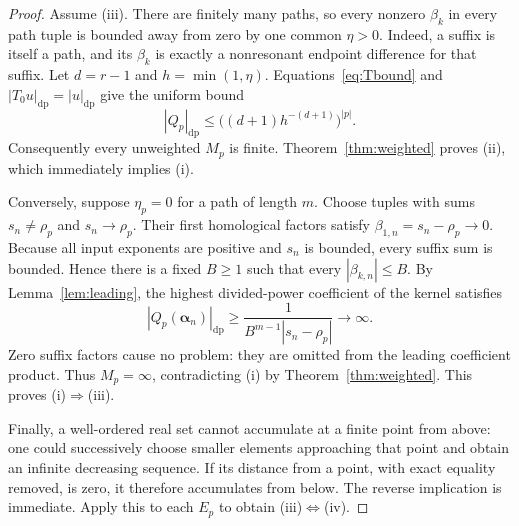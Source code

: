 \documentclass[11pt,a4paper]{article}
\numberwithin{equation}{section}
\theoremstyle{definition}
\theoremstyle{remark}
\begin{document}
\begin{proof}
Assume (iii). There are finitely many paths, so every nonzero $\beta_k$
in every path tuple is bounded away from zero by one common $\eta>0$.
Indeed, a suffix is itself a path, and its $\beta_k$ is exactly a
nonresonant endpoint difference for that suffix. Let $d=r-1$ and
$h=\min(1,\eta)$. Equations~\eqref{eq:Tbound} and
$|T_0u|_{\mathrm{dp}}=|u|_{\mathrm{dp}}$ give the uniform bound
\[
 |Q_p|_{\mathrm{dp}}
 \leq\bigl((d+1)h^{-(d+1)}\bigr)^{|p|}.
\]
Consequently every unweighted $M_p$ is finite. Theorem~\ref{thm:weighted}
proves (ii), which immediately implies (i).

Conversely, suppose $\eta_p=0$ for a path of length $m$. Choose tuples
with sums $s_n\ne\rho_p$ and $s_n\to\rho_p$. Their first homological
factors satisfy $\beta_{1,n}=s_n-\rho_p\to0$. Because all input exponents
are positive and $s_n$ is bounded, every suffix sum is bounded. Hence there
is a fixed $B\geq1$ such that every $|\beta_{k,n}|\leq B$. By
Lemma~\ref{lem:leading}, the highest divided-power coefficient of the
kernel satisfies
\begin{equation}\label{eq:blowup}
 |Q_p(\boldsymbol\alpha_n)|_{\mathrm{dp}}
 \geq\frac{1}{B^{m-1}|s_n-\rho_p|}\longrightarrow\infty.
\end{equation}
Zero suffix factors cause no problem: they are omitted from the leading
coefficient product. Thus $M_p=\infty$, contradicting (i) by
Theorem~\ref{thm:weighted}. This proves (i)$\Rightarrow$(iii).

Finally, a well-ordered real set cannot accumulate at a finite point from
above: one could successively choose smaller elements approaching that
point and obtain an infinite decreasing sequence. If its distance from a
point, with exact equality removed, is zero, it therefore accumulates from
below. The reverse implication is immediate. Apply this to each $E_p$ to
obtain (iii)$\Leftrightarrow$(iv).
\end{proof}
\end{document}

